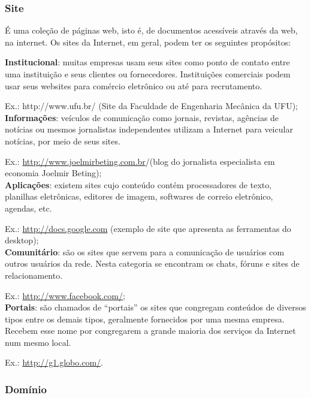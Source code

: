 \documentclass[hidelinks,12pt]{article}
\begin{document}
		 \subsubsection{Site}

		É uma coleção de páginas web, isto é, de documentos acessíveis através da web, na internet. Os sites da Internet, em geral, podem ter os seguintes propósitos:

		 \textbf{Institucional}: muitas empresas usam seus sites como ponto de contato entre uma instituição e seus clientes ou fornecedores. Instituições comerciais podem usar seus websites para comércio eletrônico ou até para recrutamento.

		Ex.: http://www.ufu.br/ (Site da Faculdade de Engenharia Mecânica da UFU);\\


		 \textbf{Informações}: veículos de comunicação como jornais, revistas, agências de notícias ou mesmos jornalistas independentes utilizam a Internet para veicular notícias, por meio de seus sites.

		Ex.: \url{http://www.joelmirbeting.com.br}/(blog do jornalista especialista em economia Joelmir Beting);\\


		 \textbf{Aplicações}: existem sites cujo conteúdo contém processadores de texto, planilhas eletrônicas, editores de imagem, softwares de correio eletrônico, agendas, etc.

		Ex.: \url{http://docs.google.com} (exemplo de site que apresenta as ferramentas do desktop);\\


		 \textbf{Comunitário}: são os sites que servem para a comunicação de usuários com outros usuários da rede. Nesta categoria se encontram os chats, fóruns e sites de relacionamento.

		Ex.: \url{http://www.facebook.com/};\\


		\textbf{Portais}: são chamados de ``portais'' os sites que congregam conteúdos de diversos tipos entre os demais tipos, geralmente fornecidos por uma mesma empresa. Recebem esse nome por congregarem a grande maioria dos serviços da Internet num mesmo local.

		Ex.: \url{http://g1.globo.com/}.\\


		\subsubsection{Domínio}
\end{document}
